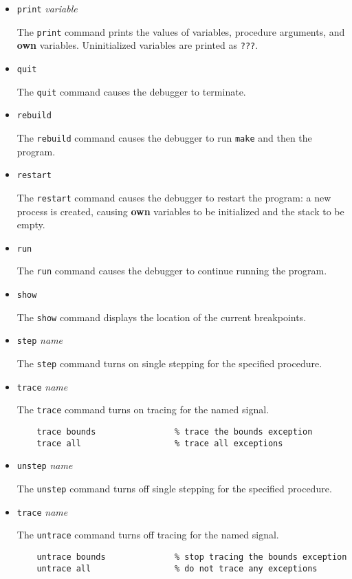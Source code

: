 \begin{itemize}
\item {\tt print} {\it variable}
  
  The {\tt print} command prints the values of variables, procedure
  arguments, and {\bf own} variables.  Uninitialized variables are
  printed as {\tt ???}.

\item {\tt quit}
  
  The {\tt quit} command causes the debugger to terminate.

\item {\tt rebuild}
  
  The {\tt rebuild} command causes the debugger to run {\tt make}
  and then the program.

\item {\tt restart}
  
  The {\tt restart} command causes the debugger to restart the
  program: a new process is created, causing {\bf own} variables to be
  initialized and the stack to be empty.

\item {\tt run}
  
  The {\tt run} command causes the debugger to continue running the
  program.

\item {\tt show}
  
  The {\tt show} command displays the location of the current
  breakpoints.

\item {\tt step} {\it name}
  
  The {\tt step} command turns on single stepping for the specified
  procedure.

\item {\tt trace} {\it name}
  
  The {\tt trace} command turns on tracing for the named signal.
  \begin{verbatim}
    trace bounds                % trace the bounds exception
    trace all                   % trace all exceptions
  \end{verbatim}

\item {\tt unstep} {\it name}
  
  The {\tt unstep} command turns off single stepping for the
  specified procedure.

\item {\tt trace} {\it name}

  The {\tt untrace} command turns off tracing for the named signal.
  \begin{verbatim}
    untrace bounds              % stop tracing the bounds exception
    untrace all                 % do not trace any exceptions
  \end{verbatim}


\end{itemize}
